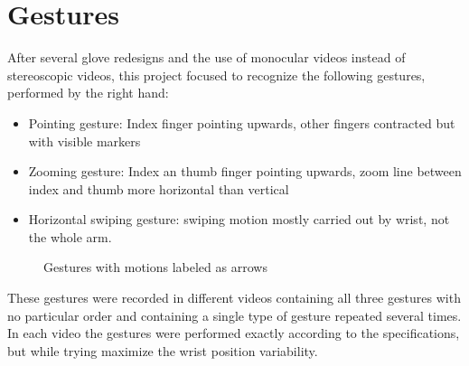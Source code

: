 \section{Gestures}
\label{sec:gestures}

After several glove redesigns and the use of monocular videos instead of stereoscopic videos, this project focused to recognize the following gestures, performed by the right hand:
\begin{itemize}
\item Pointing gesture: Index finger pointing upwards, other fingers contracted but with visible markers
\item Zooming gesture: Index an thumb finger pointing upwards, zoom line between index and thumb more horizontal than vertical
\item Horizontal swiping gesture: swiping motion mostly carried out by wrist, not the whole arm.
\end{itemize}

\begin{figure}[H]
	\centering
	\hspace{0.03\textwidth}
	\hspace{0.03\textwidth}
	
	\caption{Gestures with motions labeled as arrows}
	\label{fig:gestures}
\end{figure}

These gestures were recorded in different videos containing all three gestures with no particular order and containing a single type of gesture repeated several times. In each video the gestures were performed exactly according to the specifications, but while trying maximize the wrist position variability.
